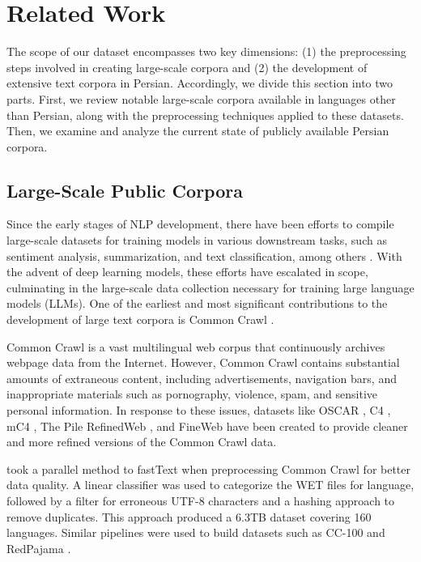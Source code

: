\section{Related Work}
The scope of our dataset encompasses two key dimensions: (1) the preprocessing steps involved in creating large-scale corpora and (2) the development of extensive text corpora in Persian. Accordingly, we divide this section into two parts. First, we review notable large-scale corpora available in languages other than Persian, along with the preprocessing techniques applied to these datasets. Then, we examine and analyze the current state of publicly available Persian corpora.

\subsection{Large-Scale Public Corpora}
Since the early stages of NLP development, there have been efforts to compile large-scale datasets for training models in various downstream tasks, such as sentiment analysis, summarization, and text classification, among others \citep{glockner2018snli, narayan2018xsum, wang2019glue}. With the advent of deep learning models, these efforts have escalated in scope, culminating in the large-scale data collection necessary for training large language models (LLMs). One of the earliest and most significant contributions to the development of large text corpora is Common Crawl \citep{commoncrawl}.

Common Crawl \citep{commoncrawl} is a vast multilingual web corpus that continuously archives webpage data from the Internet. However, Common Crawl contains substantial amounts of extraneous content, including advertisements, navigation bars, and inappropriate materials such as pornography, violence, spam, and sensitive personal information. In response to these issues, datasets like OSCAR \citep{oscar}, C4 \citep{raffel2020c4}, mC4 \citep{xue2020mt5}, The Pile \citep{gao2020pile} RefinedWeb \citep{penedo2023refinedweb}, and FineWeb \citep{penedo2024fineweb}  have been created to provide cleaner and more refined versions of the Common Crawl data.

\citet{oscar} took a parallel method to fastText \citep{athiwaratkun2018fasttext} when preprocessing Common Crawl for better data quality. A linear classifier was used to categorize the WET files for language, followed by a filter for erroneous UTF-8 characters and a hashing approach to remove duplicates. This approach produced a 6.3TB dataset covering 160 languages. Similar pipelines were used to build datasets such as CC-100 \citep{conneau2019cc100} and RedPajama \citep{together2023redpajama}.

